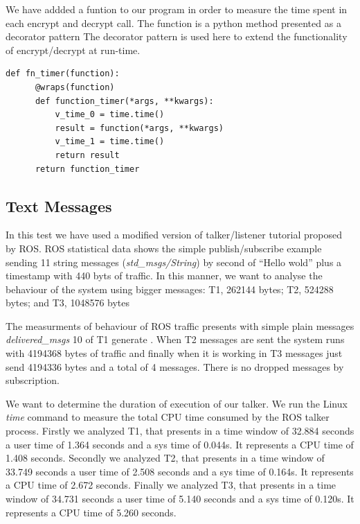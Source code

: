 \documentclass[journal,twoside]{JoPhA}
\begin{document}
We have addded a funtion to our program in order to measure the time spent in each encrypt and decrypt call. The function is a python method presented as a decorator pattern 
The decorator pattern is used here to extend the functionality of encrypt/decrypt at run-time. 


{
  \footnotesize{
    \begin{Verbatim}[frame=single]
def fn_timer(function):
	  @wraps(function)
	  def function_timer(*args, **kwargs):
	      v_time_0 = time.time()
	      result = function(*args, **kwargs)
	      v_time_1 = time.time()
	      return result
	  return function_timer
    \end{Verbatim}
  }
}


\subsection{Text Messages}


In this test we have used a modified version of talker/listener tutorial proposed by ROS. 
ROS statistical data shows the simple publish/subscribe example sending 11 string messages ({\em std\_msgs/String}) by second of ``Hello wold'' plus a timestamp with 440 byts of traffic.
In this manner, we want to analyse the behaviour of the system using bigger messages: T1, 262144 bytes; T2,  524288 bytes; and T3, 1048576 bytes 

The measurments of behaviour of ROS traffic presents with simple plain messages {\em delivered\_msgs} 10 of T1 generate . When T2 messages are sent the system runs with 4194368 bytes of traffic and finally when it is working in  T3 messages just send 4194336 bytes and a total of 4 messages. There is no dropped messages by subscription.

We want to determine the duration of execution of our talker. We run the Linux {\em time} command to measure the total CPU time consumed by the ROS talker process. 
Firstly we analyzed T1, that presents in a time window of 32.884 seconds a user time of  1.364 seconds and a sys time of 0.044s. It represents a CPU time of 1.408 seconds.
Secondly we analyzed T2, that presents in a time window of 33.749 seconds a user time of  2.508 seconds and a sys time of 0.164s. It represents a CPU time of 2.672 seconds.
Finally we analyzed T3, that presents in a time window of 34.731 seconds a user time of  5.140 seconds and a sys time of 0.120s. It represents a CPU time of 5.260 seconds.
\end{document}
